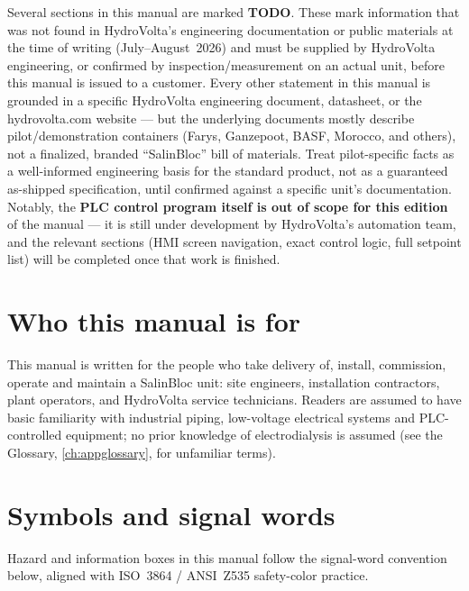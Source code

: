 \documentclass[a4paper,11pt,twoside,openright,numbers=noenddot]{scrreprt}
\newcommand{\salinbloc}{SalinBloc\texttrademark\xspace}
\begin{document}
\begin{notice}
Several sections in this manual are marked \textbf{TODO}. These mark
information that was not found in HydroVolta's engineering documentation or
public materials at the time of writing (July--August~2026) and must be
supplied by HydroVolta engineering, or confirmed by inspection/measurement
on an actual unit, before this manual is issued to a customer. Every other
statement in this manual is grounded in a specific HydroVolta engineering
document, datasheet, or the hydrovolta.com website --- but the underlying
documents mostly describe pilot/demonstration containers (Farys, Ganzepoot,
BASF, Morocco, and others), not a finalized, branded \enquote{\salinbloc}
bill of materials. Treat pilot-specific facts as a well-informed engineering
basis for the standard product, not as a guaranteed as-shipped
specification, until confirmed against a specific unit's documentation.
Notably, the \textbf{PLC control program itself is out of scope for this
edition} of the manual --- it is still under development by HydroVolta's
automation team, and the relevant sections (HMI screen navigation, exact
control logic, full setpoint list) will be completed once that work is
finished.
\end{notice}

\section{Who this manual is for}
This manual is written for the people who take delivery of, install,
commission, operate and maintain a \salinbloc unit: site engineers,
installation contractors, plant operators, and HydroVolta service
technicians. Readers are assumed to have basic familiarity with industrial
piping, low-voltage electrical systems and PLC-controlled equipment; no
prior knowledge of electrodialysis is assumed (see the Glossary,
\cref{ch:appglossary}, for unfamiliar terms).

\section{Symbols and signal words}
Hazard and information boxes in this manual follow the signal-word
convention below, aligned with ISO~3864 / ANSI~Z535 safety-color practice.
\end{document}
